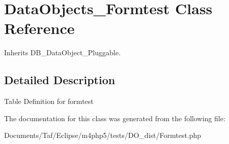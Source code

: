 \hypertarget{classDataObjects__Formtest}{
\section{DataObjects\_\-Formtest Class Reference}
\label{classDataObjects__Formtest}
}
Inherits DB\_\-DataObject\_\-Pluggable.



\subsection{Detailed Description}
Table Definition for formtest 

The documentation for this class was generated from the following file:\begin{CompactItemize}
\item 
Documents/Taf/Eclipse/m4php5/tests/DO\_\-dist/Formtest.php\end{CompactItemize}
